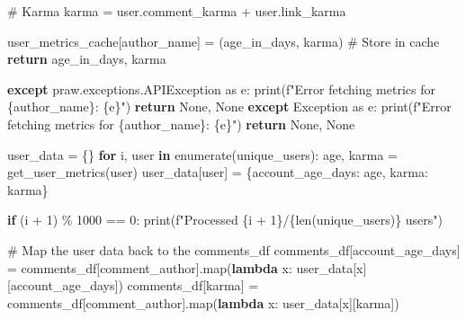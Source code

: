 \documentclass[
  12pt,
  letterpaper,
  DIV=11,
  numbers=noendperiod]{scrartcl}
\newenvironment{Shaded}{\begin{snugshade}}{\end{snugshade}}
\newcommand{\BuiltInTok}[1]{\textcolor[rgb]{0.00,0.23,0.31}{#1}}
\newcommand{\CommentTok}[1]{\textcolor[rgb]{0.37,0.37,0.37}{#1}}
\newcommand{\ControlFlowTok}[1]{\textcolor[rgb]{0.00,0.23,0.31}{\textbf{#1}}}
\newcommand{\DecValTok}[1]{\textcolor[rgb]{0.68,0.00,0.00}{#1}}
\newcommand{\ImportTok}[1]{\textcolor[rgb]{0.00,0.46,0.62}{#1}}
\newcommand{\KeywordTok}[1]{\textcolor[rgb]{0.00,0.23,0.31}{\textbf{#1}}}
\newcommand{\NormalTok}[1]{\textcolor[rgb]{0.00,0.23,0.31}{#1}}
\newcommand{\OperatorTok}[1]{\textcolor[rgb]{0.37,0.37,0.37}{#1}}
\newcommand{\PreprocessorTok}[1]{\textcolor[rgb]{0.68,0.00,0.00}{#1}}
\newcommand{\SpecialCharTok}[1]{\textcolor[rgb]{0.37,0.37,0.37}{#1}}
\newcommand{\SpecialStringTok}[1]{\textcolor[rgb]{0.13,0.47,0.30}{#1}}
\newcommand{\StringTok}[1]{\textcolor[rgb]{0.13,0.47,0.30}{#1}}
\newcommand{\VariableTok}[1]{\textcolor[rgb]{0.07,0.07,0.07}{#1}}
\begin{document}
\begin{Shaded}
\begin{Highlighting}[]
        \CommentTok{\# Karma}
\NormalTok{        karma }\OperatorTok{=}\NormalTok{ user.comment\_karma }\OperatorTok{+}\NormalTok{ user.link\_karma}

\NormalTok{        user\_metrics\_cache[author\_name] }\OperatorTok{=}\NormalTok{ (age\_in\_days, karma)  }\CommentTok{\# Store in cache}
        \ControlFlowTok{return}\NormalTok{ age\_in\_days, karma}

    \ControlFlowTok{except}\NormalTok{ praw.exceptions.APIException }\ImportTok{as}\NormalTok{ e:}
        \BuiltInTok{print}\NormalTok{(}\SpecialStringTok{f"Error fetching metrics for }\SpecialCharTok{\{}\NormalTok{author\_name}\SpecialCharTok{\}}\SpecialStringTok{: }\SpecialCharTok{\{}\NormalTok{e}\SpecialCharTok{\}}\SpecialStringTok{"}\NormalTok{)}
        \ControlFlowTok{return} \VariableTok{None}\NormalTok{, }\VariableTok{None}
    \ControlFlowTok{except} \PreprocessorTok{Exception} \ImportTok{as}\NormalTok{ e:}
        \BuiltInTok{print}\NormalTok{(}\SpecialStringTok{f"Error fetching metrics for }\SpecialCharTok{\{}\NormalTok{author\_name}\SpecialCharTok{\}}\SpecialStringTok{: }\SpecialCharTok{\{}\NormalTok{e}\SpecialCharTok{\}}\SpecialStringTok{"}\NormalTok{)}
        \ControlFlowTok{return} \VariableTok{None}\NormalTok{, }\VariableTok{None}

\NormalTok{user\_data }\OperatorTok{=}\NormalTok{ \{\}}
\ControlFlowTok{for}\NormalTok{ i, user }\KeywordTok{in} \BuiltInTok{enumerate}\NormalTok{(unique\_users):}
\NormalTok{    age, karma }\OperatorTok{=}\NormalTok{ get\_user\_metrics(user)}
\NormalTok{    user\_data[user] }\OperatorTok{=}\NormalTok{ \{}\StringTok{\textquotesingle{}account\_age\_days\textquotesingle{}}\NormalTok{: age, }\StringTok{\textquotesingle{}karma\textquotesingle{}}\NormalTok{: karma\}}

    \ControlFlowTok{if}\NormalTok{ (i }\OperatorTok{+} \DecValTok{1}\NormalTok{) }\OperatorTok{\%} \DecValTok{1000} \OperatorTok{==} \DecValTok{0}\NormalTok{:}
        \BuiltInTok{print}\NormalTok{(}\SpecialStringTok{f"Processed }\SpecialCharTok{\{}\NormalTok{i }\OperatorTok{+} \DecValTok{1}\SpecialCharTok{\}}\SpecialStringTok{/}\SpecialCharTok{\{}\BuiltInTok{len}\NormalTok{(unique\_users)}\SpecialCharTok{\}}\SpecialStringTok{ users"}\NormalTok{)}

\CommentTok{\# Map the user data back to the comments\_df}
\NormalTok{comments\_df[}\StringTok{\textquotesingle{}account\_age\_days\textquotesingle{}}\NormalTok{] }\OperatorTok{=}\NormalTok{ comments\_df[}\StringTok{\textquotesingle{}comment\_author\textquotesingle{}}\NormalTok{].}\BuiltInTok{map}\NormalTok{(}\KeywordTok{lambda}\NormalTok{ x: user\_data[x][}\StringTok{\textquotesingle{}account\_age\_days\textquotesingle{}}\NormalTok{])}
\NormalTok{comments\_df[}\StringTok{\textquotesingle{}karma\textquotesingle{}}\NormalTok{] }\OperatorTok{=}\NormalTok{ comments\_df[}\StringTok{\textquotesingle{}comment\_author\textquotesingle{}}\NormalTok{].}\BuiltInTok{map}\NormalTok{(}\KeywordTok{lambda}\NormalTok{ x: user\_data[x][}\StringTok{\textquotesingle{}karma\textquotesingle{}}\NormalTok{])}


\end{Highlighting}
\end{Shaded}
\end{document}
